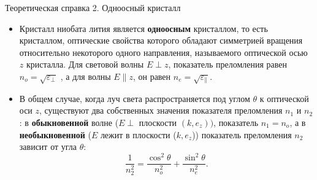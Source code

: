 \documentclass[11pt]{beamer} %
\begin{document}
    \begin{frame}{Теоретическая справка 2. Одноосный кристалл}
        \small

        \begin{itemize}
        \item Кристалл ниобата лития является \textbf{одноосным} кристаллом, то
есть кристаллом, оптические свойства которого обладают симметрией
вращения относительно некоторого одного направления, называемого
оптической осью $z$ кристалла. Для световой волны $E \perp z$, показатель преломления
равен $n_o = \sqrt{\varepsilon_\perp}$ , а для волны $E \| z$, он равен $n_e = \sqrt{\varepsilon_\|}$.
        \item В общем случае, когда луч света распространяется под углом $\theta$ к оптической оси $z$, существуют два собственных значения показателя преломления $n_1$ и $n_2$: в \textbf{обыкновенной} волне ($E \perp \text{ плоскости } (k, e_z))$, показатель $n_1 = n_o$, а в \textbf{необыкновенной} ($E$ лежит в плоскости ($k, e_z$)) показатель преломления $n_2$ зависит от угла $\theta$:
        \begin{equation}
            \dfrac{1}{n_2^2}=\dfrac{\cos^2 \theta}{n_o^2}+\dfrac{\sin^2 \theta}{n_e^2}.
        \end{equation}

    
        \end{itemize}
       
    \end{frame}
\end{document}
